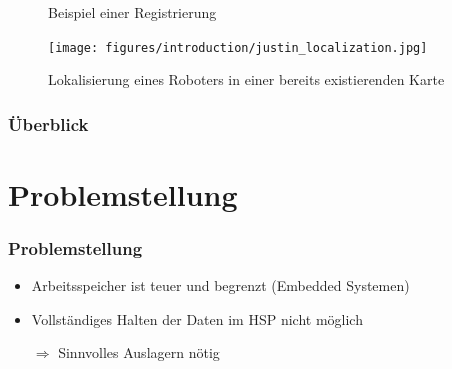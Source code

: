 \documentclass[presentation]{beamer}
\begin{document}
\begin{frame}
\begin{figure}
\begin{minipage}{.45\textwidth}
			\caption{Beispiel einer Registrierung \cite{PCLReg}}
			\label{fig:RegistrierungB1}
		\end{minipage}%
	\hspace*{0.5cm}
		\begin{minipage}{.45\textwidth} 
			\centering
			\texttt{[image: figures/introduction/justin\_localization.jpg]}
			\caption{Lokalisierung eines Roboters in einer bereits existierenden Karte}
			\label{fig:Justin}
		\end{minipage}
		\label{fig:test}
	\end{figure} 
\end{frame} 

\begin{frame}
\frametitle{Überblick}
\tableofcontents
\end{frame}


\section{Problemstellung} 
\begin{frame}
	\frametitle{Problemstellung}
	\begin{itemize}
		\item Arbeitsspeicher ist teuer und begrenzt (Embedded Systemen)
		\item Vollständiges Halten der Daten im HSP nicht möglich
		\item [$\Rightarrow$] Sinnvolles Auslagern nötig
	\end{itemize}
\end{frame}
\end{document}
